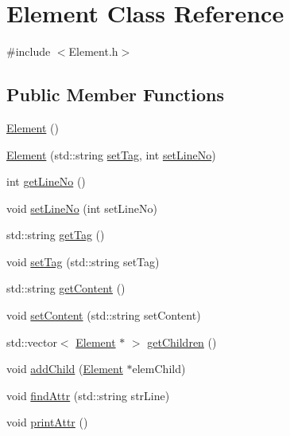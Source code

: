 \hypertarget{class_element}{}\section{Element Class Reference}
\label{class_element}


{\ttfamily \#include $<$Element.\+h$>$}

\subsection*{Public Member Functions}
\begin{DoxyCompactItemize}
\item 
\hyperlink{class_element_ab0d0e20be9a36ae676202db753faeec9}{Element} ()
\item 
\hyperlink{class_element_ad633862f931b7b0c8128799548be5d41}{Element} (std\+::string \hyperlink{class_element_aa2e34a2b19601115c47264cfe5393df5}{set\+Tag}, int \hyperlink{class_element_a0e794db96e5e940bd740884443fc790a}{set\+Line\+No})
\item 
int \hyperlink{class_element_a762e3441cdb9f57e9e38a92930b8b89e}{get\+Line\+No} ()
\item 
void \hyperlink{class_element_a0e794db96e5e940bd740884443fc790a}{set\+Line\+No} (int set\+Line\+No)
\item 
std\+::string \hyperlink{class_element_a81cffd331255cfb7c8b142ffd1c93298}{get\+Tag} ()
\item 
void \hyperlink{class_element_aa2e34a2b19601115c47264cfe5393df5}{set\+Tag} (std\+::string set\+Tag)
\item 
std\+::string \hyperlink{class_element_ada6063abc4e37aec580cb3cdf9501b4a}{get\+Content} ()
\item 
void \hyperlink{class_element_a973ef0052e83a51bc5c8e6a119405894}{set\+Content} (std\+::string set\+Content)
\item 
std\+::vector$<$ \hyperlink{class_element}{Element} $\ast$ $>$ \hyperlink{class_element_a8f8f5c6525ed8be33e0557fada9c18d3}{get\+Children} ()
\item 
void \hyperlink{class_element_a470319b8780a34d2b4f838f958428c83}{add\+Child} (\hyperlink{class_element}{Element} $\ast$elem\+Child)
\item 
void \hyperlink{class_element_addd8669954c6fbf73820d521793ca409}{find\+Attr} (std\+::string str\+Line)
\item 
void \hyperlink{class_element_af886176d937c55d5e1520e668c07f3d2}{print\+Attr} ()
\end{DoxyCompactItemize}
